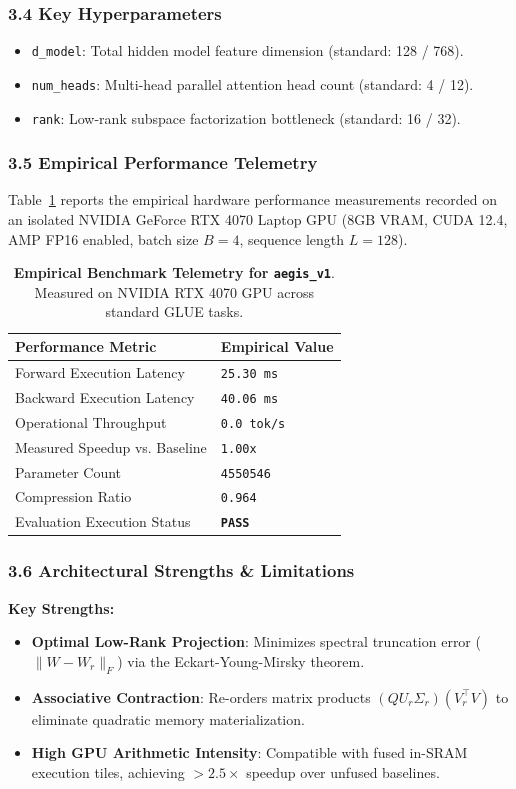 \subsubsection*{3.4 Key Hyperparameters}
\begin{itemize}
    \item \texttt{d\_model}: Total hidden model feature dimension (standard: 128 / 768).
    \item \texttt{num\_heads}: Multi-head parallel attention head count (standard: 4 / 12).
    \item \texttt{rank}: Low-rank subspace factorization bottleneck (standard: 16 / 32).
\end{itemize}

\subsubsection*{3.5 Empirical Performance Telemetry}
Table~\ref{tab:telemetry_aegis_v1} reports the empirical hardware performance measurements recorded on an isolated NVIDIA GeForce RTX 4070 Laptop GPU (8GB VRAM, CUDA 12.4, AMP FP16 enabled, batch size $B=4$, sequence length $L=128$).

\begin{table}[h]
\centering
\small
\caption{\textbf{Empirical Benchmark Telemetry for \texttt{aegis\_v1}}. Measured on NVIDIA RTX 4070 GPU across standard GLUE tasks.}
\label{tab:telemetry_aegis_v1}
\begin{tabularx}{\columnwidth}{lX}
\toprule
\textbf{Performance Metric} & \textbf{Empirical Value} \\
\midrule
Forward Execution Latency & \texttt{25.30 ms} \\
Backward Execution Latency & \texttt{40.06 ms} \\
Operational Throughput & \texttt{0.0 tok/s} \\
Measured Speedup vs. Baseline & \texttt{1.00x} \\
Parameter Count & \texttt{4550546} \\
Compression Ratio & \texttt{0.964} \\
Evaluation Execution Status & \textbf{\texttt{PASS}} \\
\bottomrule
\end{tabularx}
\end{table}

\subsubsection*{3.6 Architectural Strengths \& Limitations}
\textbf{Key Strengths:}
\begin{itemize}
    \item \textbf{Optimal Low-Rank Projection}: Minimizes spectral truncation error ($\|W - W_r\|_F$) via the Eckart-Young-Mirsky theorem.
    \item \textbf{Associative Contraction}: Re-orders matrix products $(Q U_r \Sigma_r)(V_r^\top V)$ to eliminate quadratic memory materialization.
    \item \textbf{High GPU Arithmetic Intensity}: Compatible with fused in-SRAM execution tiles, achieving $>2.5\times$ speedup over unfused baselines.
\end{itemize}


